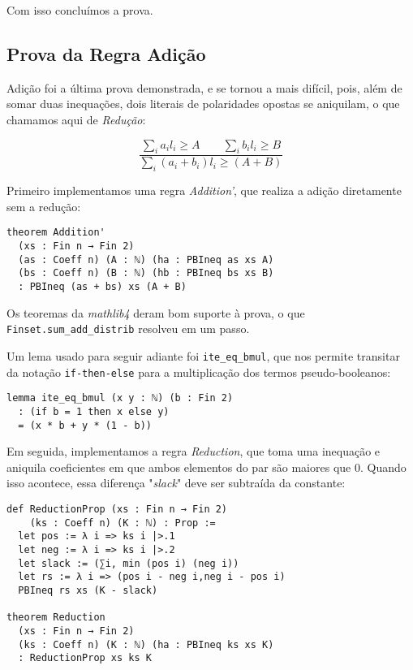 \documentclass[conference]{IEEEtran}
\begin{document}
Com isso concluímos a prova.



\subsection{Prova da Regra Adição}
Adição foi a última prova demonstrada, e se tornou a mais difícil, pois, além de somar duas inequações,
dois literais de polaridades opostas se aniquilam, o que chamamos aqui de \textit{Redução}:

\begin{equation}
    \frac
    {{\sum_i{a_i l_i} \ge A}\qquad {\sum_i{b_i l_i} \ge B}}
    {\sum_i{(a_i + b_i) l_i} \ge (A+B)}
\end{equation}

Primeiro implementamos uma regra \textit{Addition'}, que realiza a adição diretamente sem a redução:

\begin{verbatim}
theorem Addition'
  (xs : Fin n → Fin 2)
  (as : Coeff n) (A : ℕ) (ha : PBIneq as xs A)
  (bs : Coeff n) (B : ℕ) (hb : PBIneq bs xs B)
  : PBIneq (as + bs) xs (A + B)
\end{verbatim}

Os teoremas da \textit{mathlib4} deram bom suporte à prova, o que \texttt{Finset.sum\_add\_distrib} resolveu em um passo.

Um lema usado para seguir adiante foi \texttt{ite\_eq\_bmul},
que nos permite transitar da notação \texttt{if-then-else}
para a multiplicação dos termos pseudo-booleanos:

\begin{verbatim}
lemma ite_eq_bmul (x y : ℕ) (b : Fin 2)
  : (if b = 1 then x else y)
  = (x * b + y * (1 - b))
\end{verbatim}

Em seguida, implementamos a regra \textit{Reduction}, que toma uma inequação e aniquila coeficientes
em que ambos elementos do par são maiores que $0$.
Quando isso acontece, essa diferença "\textit{slack}" deve ser subtraída da constante:

\begin{verbatim}
def ReductionProp (xs : Fin n → Fin 2)
    (ks : Coeff n) (K : ℕ) : Prop :=
  let pos := λ i => ks i |>.1
  let neg := λ i => ks i |>.2
  let slack := (∑i, min (pos i) (neg i))
  let rs := λ i => (pos i - neg i,neg i - pos i)
  PBIneq rs xs (K - slack)

theorem Reduction
  (xs : Fin n → Fin 2)
  (ks : Coeff n) (K : ℕ) (ha : PBIneq ks xs K)
  : ReductionProp xs ks K
\end{verbatim}
\end{document}
